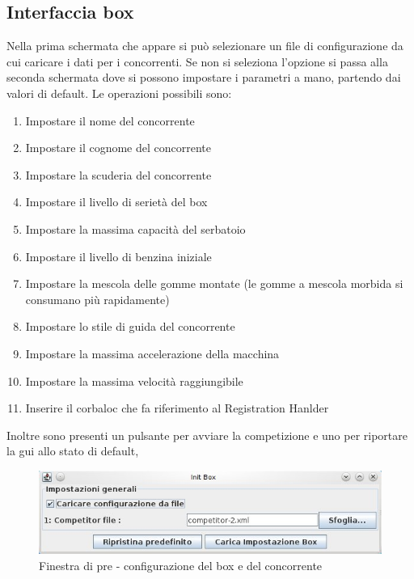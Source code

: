 \subsection{Interfaccia box}
Nella prima schermata che appare si può selezionare un file di configurazione da cui caricare i dati per i concorrenti. Se non si seleziona l'opzione si passa alla seconda schermata dove si possono impostare i parametri a mano, partendo dai valori di default. 
Le operazioni possibili sono:
\begin{enumerate}
\item Impostare il nome del concorrente
\item Impostare il cognome del concorrente
\item Impostare la scuderia del concorrente
\item Impostare il livello di seriet\`{a} del box
\item Impostare la massima capacit\`{a} del serbatoio
\item Impostare il livello di benzina iniziale
\item Impostare la mescola delle gomme montate (le gomme a mescola morbida si consumano pi\`{u} rapidamente)
\item Impostare lo stile di guida del concorrente 
\item Impostare la massima accelerazione della macchina
\item Impostare la massima velocit\`{a} raggiungibile
\item Inserire il corbaloc che fa riferimento al Registration Hanlder
\end{enumerate}
Inoltre sono presenti un pulsante per avviare la competizione e uno per riportare la gui allo stato di default,
\begin{center}
\begin{figure}[H]
	\includegraphics[scale=0.75]{screenshotRelazione/box1.jpeg}
	\caption{Finestra di pre - configurazione del box e del concorrente}
\end{figure}
\end{center}
